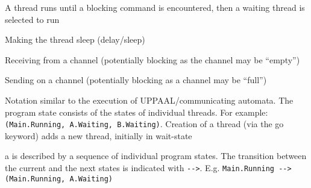 \documentclass[landscape, a4paper]{article}
\begin{document}
\begin{minipage}[t]{0.2\linewidth}
\begin{betterlist}
\begin{betterlist}
			\item {} A thread runs until a blocking command is encountered, then a waiting thread is selected to run
		\end{betterlist}
	\end{betterlist}
	\begin{betterlist}
		\item {}
		\begin{betterlist}
			\item Making the thread sleep (delay/sleep)
			\item Receiving from a channel (potentially blocking as the channel may be \enquote{empty})
			\item Sending on a channel (potentially blocking as a channel may be \enquote{full})
		\end{betterlist}
		\item {}
		\begin{betterlist}
			\item Notation similar to the execution of UPPAAL/communicating automata. The program state consists of the states of individual threads. For example: \verb|(Main.Running, A.Waiting, B.Waiting)|. Creation of a thread (via the go keyword) adds a new thread, initially in wait-state
			\item a  is described by a sequence of individual program states. The transition between the current and the next states is indicated with \verb|-->|. E.g. \verb|Main.Running --> (Main.Running, A.Waiting)|
		\end{betterlist}
	\end{betterlist}



\end{minipage}
\end{document}
